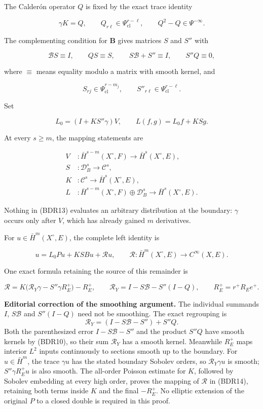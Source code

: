 \documentclass[
  11pt,
]{article}
\begin{document}
The Calderón operator \(Q\) is fixed by the exact trace identity

\[
 \gamma K=Q,\qquad
 Q_{r\ell}\in\Psi_{\mathrm{cl}}^{r-\ell},\qquad
 Q^2-Q\in\Psi^{-\infty}.
 \tag{BDR9}
\]

The complementing condition for \(\mathbf B\) gives matrices \(S\) and
\(S''\) with

\[
 \mathcal BS\equiv I,\qquad QS\equiv S,\qquad
 S\mathcal B+S''\equiv I,\qquad S''Q\equiv0,
 \tag{BDR10}
\]

where \(\equiv\) means equality modulo a matrix with smooth kernel, and

\[
 S_{rj}\in\Psi_{\mathrm{cl}}^{r-m_j},\qquad
 S''_{r\ell}\in\Psi_{\mathrm{cl}}^{r-\ell}.
 \tag{BDR11}
\]

Set

\[
 L_0=(I+KS''\gamma)V,\qquad
 L(f,g)=L_0f+KSg.
 \tag{BDR12}
\]

At every \(s\geq m\), the mapping statements are

\[
 \begin{aligned}
 V&:\bar H^{s-m}(X^\circ,F)\longrightarrow\bar H^s(X^\circ,E),\\
 S&:\mathcal D_B^s\longrightarrow\mathcal C^s,\\
 K&:\mathcal C^s\longrightarrow\bar H^s(X^\circ,E),\\
 L&:\bar H^{s-m}(X^\circ,F)\oplus\mathcal D_B^s
       \longrightarrow\bar H^s(X^\circ,E).
 \end{aligned}
 \tag{BDR13}
\]

Nothing in (BDR13) evaluates an arbitrary distribution at the boundary:
\(\gamma\) occurs only after \(V\), which has already gained \(m\)
derivatives.

For \(u\in\bar H^m(X^\circ,E)\), the complete left identity is

\[
 u=L_0Pu+KSBu+\mathcal Ru,
 \qquad
 \mathcal R:\bar H^m(X^\circ,E)\longrightarrow C^\infty(X,E).
 \tag{BDR14}
\]

One exact formula retaining the source of this remainder is

\[
 \mathcal R
 =K\bigl(\mathcal R_Y\gamma-S''\gamma R_E^+\bigr)-R_E^+,
 \qquad
 \mathcal R_Y=I-S\mathcal B-S''(I-Q),
 \qquad R_E^+=r^+R_Ee^+.
 \tag{BDR15}
\]

\textbf{Editorial correction of the smoothing argument.} The individual
summands \(I\), \(S\mathcal B\) and \(S''(I-Q)\) need not be smoothing.
The exact regrouping is \[
 \mathcal R_Y=(I-S\mathcal B-S'')+S''Q.
 \tag{BDR15a}
\] Both the parenthesized error \(I-S\mathcal B-S''\) and the product
\(S''Q\) have smooth kernels by (BDR10), so their sum \(\mathcal R_Y\)
has a smooth kernel. Meanwhile \(R_E^+\) maps interior \(L^2\) inputs
continuously to sections smooth up to the boundary. For
\(u\in\bar H^m\), the trace \(\gamma u\) has the stated boundary Sobolev
orders, so \(\mathcal R_Y\gamma u\) is smooth; \(S''\gamma R_E^+u\) is
also smooth. The all-order Poisson estimate for \(K\), followed by
Sobolev embedding at every high order, proves the mapping of
\(\mathcal R\) in (BDR14), retaining both terms inside \(K\) and the
final \(-R_E^+\). No elliptic extension of the original \(P\) to a
closed double is required in this proof.
\end{document}
